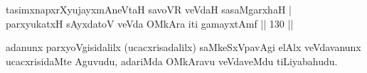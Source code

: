 \begin{shl}
tasimxnapxrXyujayxmAneV\s taH savoVR veVdaH sasaMgarxhaH   | \\
 parxyukatxH sAyxdatoV veVda OMkAra iti gamayxtAmf \hfill||  130 ||  
\end{shl}

\begin{artha}
adanunx parxyoVgisidalilx (ucacxrisadalilx) saMkeSxVpavAgi elAlx veVdavanunx ucacxrisidaMte Aguvudu, adariMda OMkAravu veVdaveMdu tiLiyabahudu.
\end{artha}

\centerline{}
